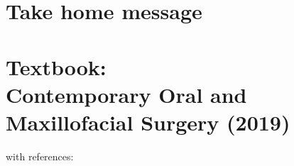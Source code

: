 \documentclass[
paper=landscape,
paper=160mm:90mm, %
fontsize=11pt, %
pagesize, %
parskip=half-, %
]{scrartcl} %
\theoremstyle{mythmstyle} %
\begin{document}




\clearpage


\section{Take home message}


\section*{Textbook: \\
Contemporary Oral and Maxillofacial Surgery (2019)
}
with references:
\autocite{Harris2022, Kawashita2020, Migliorati2022}

\printbibliography[title={Whole bibliography}]
\thispagestyle{headings} %
%
%

\begin{center}
    

\end{center}

\clearpage


\thispagestyle{empty} %
\end{document}
